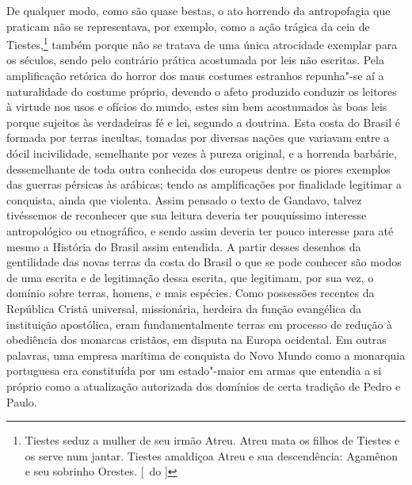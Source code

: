 De qualquer modo, como são quase bestas, o ato horrendo da antropofagia
que praticam não se representava, por exemplo, como a ação trágica da
ceia de Tiestes,\footnote{ Tiestes seduz a mulher de seu irmão Atreu. Atreu
mata os filhos de Tiestes e os serve num jantar. Tiestes amaldiçoa Atreu e sua descendência:
Agamênon e seu sobrinho Orestes. [~do ]} também porque não se tratava de uma única
atrocidade exemplar para os séculos, sendo pelo contrário prática
acostumada por leis não escritas. Pela amplificação retórica do horror
dos maus costumes estranhos repunha"-se aí a naturalidade do costume
próprio, devendo o afeto produzido conduzir os leitores à virtude nos
usos e ofícios do mundo, estes sim bem acostumados às boas leis porque
sujeitos às verdadeiras fé e lei, segundo a doutrina. Esta costa do
Brasil é formada por terras incultas, tomadas por diversas nações que
variavam entre a dócil incivilidade, semelhante por vezes à pureza
original, e a horrenda barbárie, dessemelhante de toda outra conhecida
dos europeus dentre os piores exemplos das guerras pérsicas às
arábicas; tendo as amplificações por finalidade legitimar a conquista,
ainda que violenta. Assim pensado o texto de Gandavo, talvez tivéssemos
de reconhecer que sua leitura deveria ter pouquíssimo interesse
antropológico ou etnográfico, e sendo assim deveria ter pouco interesse
para até mesmo a História do Brasil assim entendida. A partir desses
desenhos da gentilidade das novas terras da costa do Brasil o que se
pode conhecer são modos de uma escrita e de legitimação dessa escrita,
que legitimam, por sua vez, o domínio sobre terras, homens, e mais
espécies. Como possessões recentes da República Cristã universal,
missionária, herdeira da função evangélica da instituição apostólica,
eram fundamentalmente terras em processo de redução à obediência dos
monarcas cristãos, em disputa na Europa ocidental. Em outras palavras,
uma empresa marítima de conquista do Novo Mundo como a monarquia
portuguesa era constituída por um estado"-maior em armas que entendia a
si próprio como a atualização autorizada dos domínios de certa tradição
de Pedro e Paulo.

